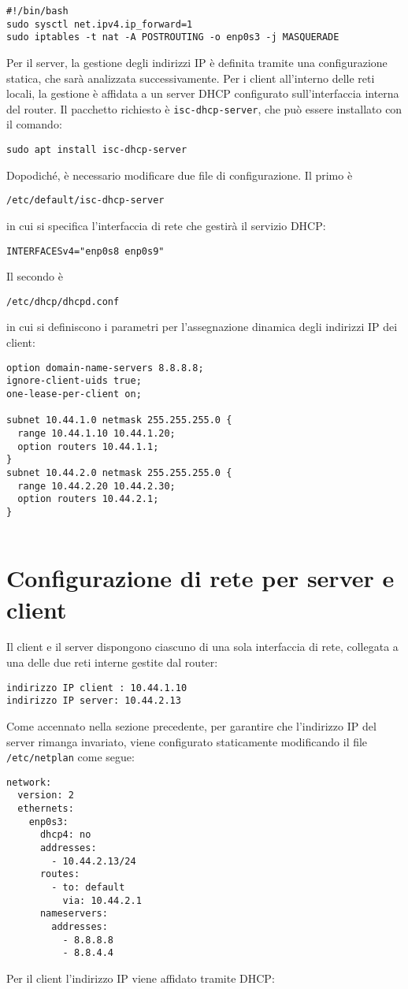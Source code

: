 \documentclass[12pt,a4paper]{report}
\begin{document}
\begin{lstlisting}
#!/bin/bash
sudo sysctl net.ipv4.ip_forward=1
sudo iptables -t nat -A POSTROUTING -o enp0s3 -j MASQUERADE
\end{lstlisting} 
Per il server, la gestione degli indirizzi IP è definita tramite una configurazione statica, che sarà analizzata successivamente. Per i client all'interno delle reti locali, la gestione è affidata a un server DHCP configurato sull’interfaccia interna del router. Il pacchetto richiesto è \texttt{isc-dhcp-server}, che può essere installato con il comando:


\begin{lstlisting}
sudo apt install isc-dhcp-server 
\end{lstlisting} Dopodiché, è necessario modificare due file di configurazione. Il primo è 
\begin{lstlisting}
/etc/default/isc-dhcp-server
\end{lstlisting}in cui si specifica l’interfaccia di rete che gestirà il servizio DHCP:
\begin{lstlisting}
INTERFACESv4="enp0s8 enp0s9"
\end{lstlisting}Il secondo è
\begin{lstlisting}
/etc/dhcp/dhcpd.conf
\end{lstlisting} in cui si definiscono i parametri per l'assegnazione dinamica degli indirizzi IP dei client:
\begin{lstlisting}
option domain-name-servers 8.8.8.8;
ignore-client-uids true;
one-lease-per-client on;

subnet 10.44.1.0 netmask 255.255.255.0 {
  range 10.44.1.10 10.44.1.20;
  option routers 10.44.1.1;
}
subnet 10.44.2.0 netmask 255.255.255.0 {
  range 10.44.2.20 10.44.2.30;
  option routers 10.44.2.1;
}
  
\end{lstlisting}
\section{Configurazione di rete per server e client }

 Il client e il server dispongono ciascuno di una sola interfaccia di rete, collegata a una delle due reti interne gestite dal router:  
\begin{lstlisting}
indirizzo IP client : 10.44.1.10
indirizzo IP server: 10.44.2.13
\end{lstlisting}Come accennato nella sezione precedente, per garantire che l'indirizzo IP del server rimanga invariato, viene configurato staticamente modificando il file \texttt{/etc/netplan} come segue:
\begin{lstlisting}
network:
  version: 2
  ethernets:
    enp0s3:
      dhcp4: no
      addresses:
        - 10.44.2.13/24
      routes:
        - to: default
          via: 10.44.2.1
      nameservers:
        addresses:
          - 8.8.8.8
          - 8.8.4.4
\end{lstlisting}Per il client l'indirizzo IP viene affidato tramite DHCP:
\end{document}
